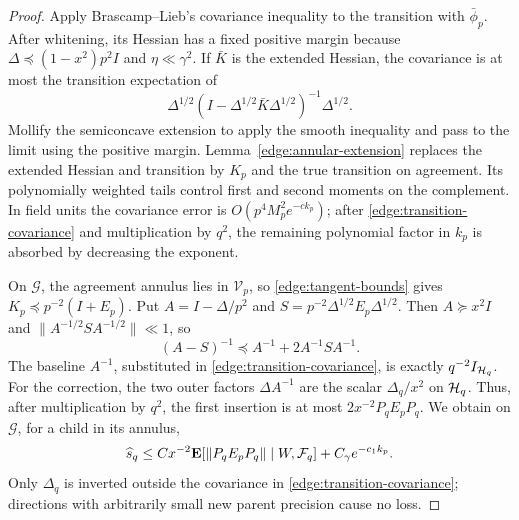 \begin{proof}
Apply Brascamp--Lieb's covariance inequality \cite{BrascampLieb1976}
to the transition with \(\bar\phi_p\).  After whitening, its Hessian
has a fixed positive margin because
\(\Delta\preceq(1-x^2)p^2I\) and \(\eta\ll\gamma^2\).
If \(\bar K\) is the extended Hessian, the covariance is at most the
transition expectation of
\[
 \Delta^{1/2}
 (I-\Delta^{1/2}\bar K\Delta^{1/2})^{-1}\Delta^{1/2}.
\]
Mollify the semiconcave extension to apply the smooth inequality and
pass to the limit using the positive margin.
Lemma~\ref{edge:annular-extension} replaces the extended Hessian and
transition by \(K_p\) and the true transition on agreement.  Its
polynomially weighted tails control first and second moments on the
complement.  In field units the covariance error is
\(O(p^4M_p^2e^{-c k_p})\); after
\eqref{edge:transition-covariance} and multiplication by \(q^2\),
the remaining polynomial factor in \(k_p\) is absorbed by decreasing
the exponent.

On \(\mathcal G\), the agreement annulus lies in \(\mathcal V_p\), so
\eqref{edge:tangent-bounds} gives
\(K_p\preceq p^{-2}(I+E_p)\).  Put
\(A=I-\Delta/p^2\) and
\(S=p^{-2}\Delta^{1/2}E_p\Delta^{1/2}\).
Then \(A\succeq x^2I\) and
\(\|A^{-1/2}SA^{-1/2}\|\ll1\), so
\[
 (A-S)^{-1}\preceq A^{-1}+2A^{-1}SA^{-1}.
\]
The baseline \(A^{-1}\), substituted in
\eqref{edge:transition-covariance}, is exactly \(q^{-2}I_{\mathcal H_q}\).
For the correction, the two outer factors \(\Delta A^{-1}\) are the
scalar \(\Delta_q/x^2\) on \(\mathcal H_q\).  Thus, after multiplication by
\(q^2\), the first insertion is at most \(2x^{-2}P_qE_pP_q\).
We obtain on \(\mathcal G\), for a child in its annulus,
\begin{equation}\label{edge:parent-inequality}
 \widehat s_q
 \le Cx^{-2}\mathbf E[\|P_qE_pP_q\|\mid W,\mathcal F_q]
       +C_\gamma e^{-c_1k_p}.
\end{equation}
Only \(\Delta_q\) is inverted outside the covariance in
\eqref{edge:transition-covariance}; directions with arbitrarily small
new parent precision cause no loss.


\end{proof}

